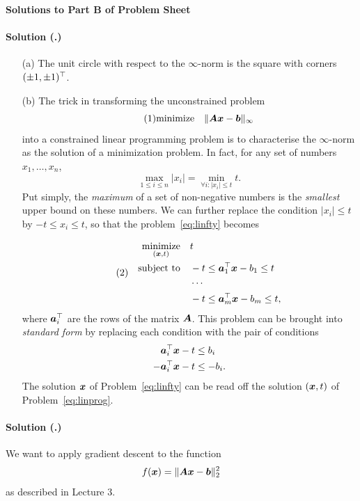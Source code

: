 \documentclass{article}
\newcounter{problemSheetNumber}
\newcounter{problems}
\renewcommand{\solution}[1]{\paragraph{Solution (\theproblemSheetNumber.\theproblems)}\addtocounter{problems}{1}\label{#1}}
\begin{document}
 
\begin{center}
{\Large {\bf Solutions to Part B of Problem Sheet \theproblemSheetNumber}}
\end{center}

\solution{pr:3} 
\begin{itemize}
\item[(a)] The unit circle with respect to the $\infty$-norm is the square with corners $(\pm 1,\pm 1)^{\top}$.
\item[(b)] The trick in transforming the unconstrained problem
\begin{equation}\label{eq:linfty}\tag{1}
 \text{minimize}\quad \Vert {\bm{A}\bm{x}-\bm{b}}\Vert_{\infty}
\end{equation}
into a constrained linear programming problem is to characterise the $\infty$-norm as the solution of a minimization problem. In fact, for any set of numbers $x_1,\dots,x_n$,
\begin{equation*}
 \max_{1\leq i\leq n} |x_i| = \min_{\forall i\colon |x_i|\leq t} t.
\end{equation*}
Put simply, the {\em maximum} of a set of non-negative numbers is the {\em smallest} upper bound on these numbers. We can further replace the condition $|x_i|\leq t$ by $-t\leq x_i\leq t$, so that the problem~\eqref{eq:linfty} becomes

\begin{align}\label{eq:linprog}\tag{2}
\begin{split}
\mathop{\text{minimize}}_{(\bm{x},t)} \quad & t \\
\quad\text{subject to}\quad & -t \leq \bm{a}_1^{\top} \bm{x} - b_1 \leq t\\
& \cdots\\
& -t \leq \bm{a}_m^{\top}\bm{x} - b_m \leq t,
\end{split}
\end{align}
where $\bm{a}_i^{\top}$ are the rows of the matrix $\bm{A}$. This problem can be brought into {\em standard form} by replacing each condition with the pair of conditions
\begin{align*}
 \bm{a}_i^{\top}\bm{x}-t&\leq b_i\\
 -\bm{a}_i^{\top}\bm{x}-t& \leq -b_i.
\end{align*}
The solution $\bm{x}$ of Problem~\eqref{eq:linfty} can be read off the solution $(\bm{x},t)$ of Problem~\eqref{eq:linprog}.
\end{itemize}




\solution{pr:3} We want to apply gradient descent to the function
\begin{equation*}
  f(\bm{x}) = \Vert {\bm{A}\bm{x}-\bm{b}}\Vert_2^2
\end{equation*}
as described in Lecture 3.
\end{document}
